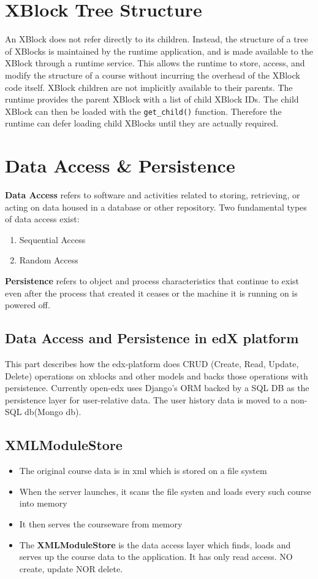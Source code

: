 \section{XBlock Tree Structure}
An XBlock does not refer directly to its children. Instead, the structure of a tree of XBlocks is
maintained by the runtime application, and is made available to the XBlock through a runtime
service.\newline
This allows the runtime to store, access, and modify the structure of a course without incurring the
overhead of the XBlock code itself.\newline
XBlock children are not implicitly available to their parents. The runtime provides the parent
XBlock with a list of child XBlock IDs. The child XBlock can then be loaded with the
\verb|get_child()| function. Therefore the runtime can defer loading child XBlocks until they are actually
required.

\section{Data Access \& Persistence}
\textbf{Data Access} refers to software and activities related to storing, retrieving, or acting on data housed
in a database or other repository. Two fundamental types of data access exist:
\begin{enumerate}
	\item Sequential Access
	\item Random Access
\end{enumerate}
\textbf{Persistence} refers to object and process characteristics that continue to exist even after the
process that created it ceases or the machine it is running on is powered off.

\subsection{Data Access and Persistence in edX platform}
This part describes how the edx-platform does CRUD (Create, Read, Update, Delete) operations on
xblocks and other models and backs those operations with persistence. Currently open-edx uses
Django's ORM backed by a SQL DB as the persistence layer for user-relative data. The user history
data is moved to a non-SQL db(Mongo db).

\subsection{XMLModuleStore}
\begin{itemize}
	\item The original course data is in xml which is stored on a file system
	\item When the server launches, it scans the file systen and loads every such course into memory
	\item It then serves the courseware from memory
	\item The \textbf{XMLModuleStore} is the data access layer which finds, loads and serves up the course data to the application. It has only read access. NO create, update NOR delete.
\end{itemize}


